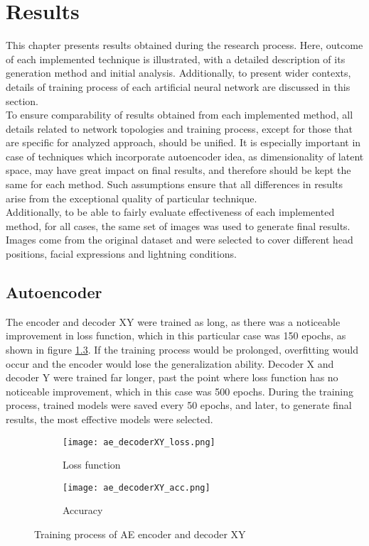 \chapter{Results}
This chapter presents results obtained during the research process. Here, outcome of each implemented technique is illustrated, with a detailed description of its generation method and initial analysis. Additionally, to present wider contexts, details of training process of each artificial neural network are discussed in this section.\\

To ensure comparability of results obtained from each implemented method, all details related to network topologies and training process, except for those that are specific for analyzed approach, should be unified. It is especially important in case of techniques which incorporate autoencoder idea, as dimensionality of latent space, may have great impact on final results, and therefore should be kept the same for each method. Such assumptions ensure that all differences in results arise from the exceptional quality of particular technique.\\

Additionally, to be able to fairly evaluate effectiveness of each implemented method, for all cases, the same set of images was used to generate final results. Images come from the original dataset and were selected to cover different head positions, facial expressions and lightning conditions.

\newpage
\section{Autoencoder}
\label{Results_Autoencoder}
The encoder and decoder XY were trained as long, as there was a noticeable improvement in loss function, which in this particular case was 150 epochs, as shown in figure \ref{fig:ae_decoderXY}. If the training process would be prolonged, overfitting would occur and the encoder would lose the generalization ability. Decoder X and decoder Y were trained far longer, past the point where loss function has no noticeable improvement, which in this case was 500 epochs. During the training process, trained models were saved every 50 epochs, and later, to generate final results, the most effective models were selected.

\begin{figure}[H]
\centering
\begin{subfigure}{.5\textwidth}
  \centering
  \texttt{[image: ae\_decoderXY\_loss.png]}
  \caption{Loss function}
  \label{subfig:ae_decoderXY_loss}
\end{subfigure}%
\begin{subfigure}{.5\textwidth}
  \centering
  \texttt{[image: ae\_decoderXY\_acc.png]}
  \caption{Accuracy}
  \label{subfig:ae_decoderXY_acc}
\end{subfigure}
\caption{Training process of AE encoder and decoder XY}
\label{fig:ae_decoderXY}
\end{figure}

